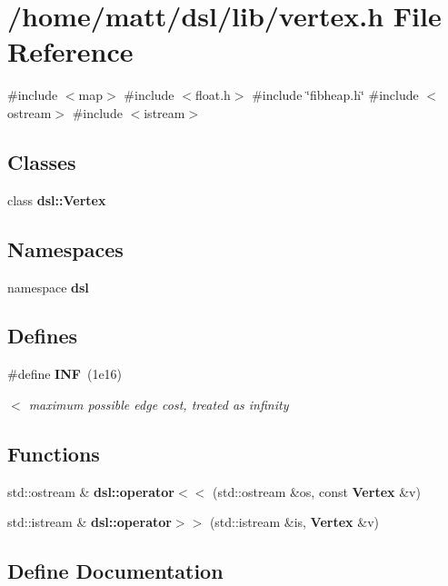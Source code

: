 \section{/home/matt/dsl/lib/vertex.h \-File \-Reference}
\label{vertex_8h}
{\ttfamily \#include $<$map$>$}\*
{\ttfamily \#include $<$float.\-h$>$}\*
{\ttfamily \#include \char`\"{}fibheap.\-h\char`\"{}}\*
{\ttfamily \#include $<$ostream$>$}\*
{\ttfamily \#include $<$istream$>$}\*
\subsection*{\-Classes}
\begin{DoxyCompactItemize}
\item 
class {\bf dsl\-::\-Vertex}
\end{DoxyCompactItemize}
\subsection*{\-Namespaces}
\begin{DoxyCompactItemize}
\item 
namespace {\bf dsl}
\end{DoxyCompactItemize}
\subsection*{\-Defines}
\begin{DoxyCompactItemize}
\item 
\#define {\bf \-I\-N\-F}~(1e16)
\begin{DoxyCompactList}\small\item\em $<$ maximum possible edge cost, treated as infinity \end{DoxyCompactList}\end{DoxyCompactItemize}
\subsection*{\-Functions}
\begin{DoxyCompactItemize}
\item 
std\-::ostream \& {\bf dsl\-::operator$<$$<$} (std\-::ostream \&os, const {\bf \-Vertex} \&v)
\item 
std\-::istream \& {\bf dsl\-::operator$>$$>$} (std\-::istream \&is, {\bf \-Vertex} \&v)
\end{DoxyCompactItemize}


\subsection{\-Define \-Documentation}
